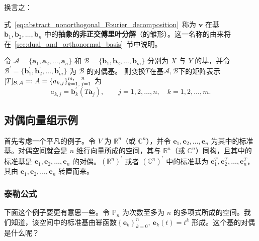 换言之：
\begin{center}
\end{center}

式~\eqref{eq:abstract_nonorthogonal_Fourier_decomposition}~称为 $\mathbf{v}$ 在基
$\mathbf{b}_1,\mathbf{b}_2,\ldots,\mathbf{b}_n$ 中的{\bf 抽象的非正交傅里叶分解}（的雏形）。这一名称的由来将在~\ref{sec:dual_and_orthonormal_basis}~节中说明。

\begin{remark}
    令 $\mathcal{A}=\{\mathbf{a}_1,\mathbf{a}_2,\ldots,\mathbf{a}_n\}$ 和
    $\mathcal{B}=\{\mathbf{b}_1,\mathbf{b}_2,\ldots,\mathbf{b}_m\}$ 分别为 $X$ 与 $Y$ 的基，并令
    $\mathcal{B}^\prime=\{\mathbf{b}_1^\prime,\mathbf{b}_2^\prime,\ldots,\mathbf{b}_m^\prime\}$ 为 $\mathcal{B}$ 的对偶基。
    则变换$T$在基$\mathcal{A},\mathcal{B}$下的矩阵表示$[T]_{\mathcal{B},\mathcal{A}}=:A=\{a_{k,j}\}_{k=1,}^{m,}\,{\vphantom{)}}_{j=1}^{n}$
    为
    \[
        a_{k,j}
        =\mathbf{b}_k^\prime(T\mathbf{a}_j),
        \qquad
        j=1,2,\ldots,n,\quad k=1,2,\ldots,m.
    \]
\end{remark}

\subsection{对偶向量组示例}

首先考虑一个平凡的例子。令 $V$ 为 $\mathbb{R}^n$（或 $\mathbb{C}^n$），并令 $\mathbf{e}_1, \mathbf{e}_2, \ldots, \mathbf{e}_n$ 为其中的标准基。对偶空间就会是 $n$ 维行向量所成的空间，其与 $\mathbb{R}^n$（或 $\mathbb{C}^n$）同构，且其中的标准基是 $\mathbf{e}_1, \mathbf{e}_2, \ldots, \mathbf{e}_n$ 的对偶。$\left( \mathbb{R}^n \right)^{\prime}$ 或者 $\left( \mathbb{C}^n \right)^{\prime}$ 中的标准基为 $\mathbf{e}^T_1, \mathbf{e}^T_2, \ldots, \mathbf{e}^T_n$，其由 $\mathbf{e}_1, \mathbf{e}_2, \ldots, \mathbf{e}_n$ 转置而来。

\subsubsection{泰勒公式}

下面这个例子要更有意思一些。令 $\mathbb{P}_n$ 为次数至多为 $n$ 的多项式所成的空间。我们知道，该空间中的标准基由幂函数$\left\{ \mathbf{e}_k \right\}^{n}_{k=0},\  \mathbf{e}_{k}(t) = t^k$ 形成。这个基的对偶是什么呢？%

